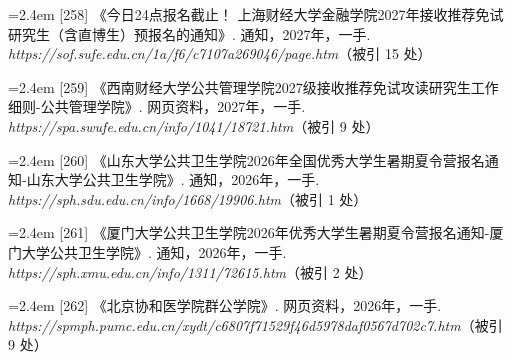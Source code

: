 {\vspace{0.6pt}
\vspace{3.5pt}\par
\nopagebreak\vspace{1pt}
\noindent\hangindent=2.4em \label{src:S0330}{\color{cAccent}[258]} 《今日24点报名截止！\textbar{} 上海财经大学金融学院2027年接收推荐免试研究生（含直博生）预报名的通知》. 通知，2027年，一手. \textit{https://sof.sufe.edu.cn/1a/f6/c7107a269046/page.htm}（被引 15 处）\par
\vspace{0.6pt}
\vspace{3.5pt}\par
\nopagebreak\vspace{1pt}
\noindent\hangindent=2.4em \label{src:S0332}{\color{cAccent}[259]} 《西南财经大学公共管理学院2027级接收推荐免试攻读研究生工作细则-公共管理学院》. 网页资料，2027年，一手. \textit{https://spa.swufe.edu.cn/info/1041/18721.htm}（被引 9 处）\par
\vspace{0.6pt}
\vspace{3.5pt}\par
\nopagebreak\vspace{1pt}
\noindent\hangindent=2.4em \label{src:S0335}{\color{cAccent}[260]} 《山东大学公共卫生学院2026年全国优秀大学生暑期夏令营报名通知-山东大学公共卫生学院》. 通知，2026年，一手. \textit{https://sph.sdu.edu.cn/info/1668/19906.htm}（被引 1 处）\par
\vspace{0.6pt}
\vspace{3.5pt}\par
\nopagebreak\vspace{1pt}
\noindent\hangindent=2.4em \label{src:S0336}{\color{cAccent}[261]} 《厦门大学公共卫生学院2026年优秀大学生暑期夏令营报名通知-厦门大学公共卫生学院》. 通知，2026年，一手. \textit{https://sph.xmu.edu.cn/info/1311/72615.htm}（被引 2 处）\par
\vspace{0.6pt}
\vspace{3.5pt}\par
\nopagebreak\vspace{1pt}
\noindent\hangindent=2.4em \label{src:S0337}{\color{cAccent}[262]} 《北京协和医学院群公学院》. 网页资料，2026年，一手. \textit{https://spmph.pumc.edu.cn/xydt/c6807f71529f46d5978daf0567d702c7.htm}（被引 9 处）\par
}
